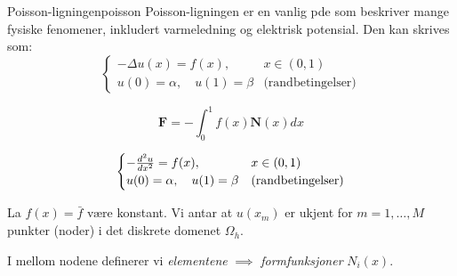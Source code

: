 \begin{example}{Poisson-ligningen}{poisson}
	Poisson-ligningen er en vanlig \gls{pde} som beskriver mange fysiske fenomener, inkludert varmeledning og elektrisk potensial.
	Den kan skrives som:
	\begin{equation}
		\begin{cases}
			-\Delta u(x) = f(x),              & x \in (0,1)              \\
			u(0) = \alpha, \quad u(1) = \beta & \text{(randbetingelser)}
		\end{cases}
	\end{equation}

	\begin{equation}
		\mathbf{F} = - \int_0^1 f(x) \mathbf{N}(x) dx
	\end{equation}

	\begin{equation}
		\begin{cases}
			-\ddn[u]{2}{x} = f(x),            & x \in (0,1)              \\
			u(0) = \alpha, \quad u(1) = \beta & \text{(randbetingelser)}
		\end{cases}
	\end{equation}

\end{example}

La \(f(x) = \bar{f}\) være konstant. Vi antar at \(u(x_m)\) er ukjent for \(m = 1, \ldots, M\) punkter (noder) i det diskrete domenet \(\Omega_h\).

I mellom nodene definerer vi \textit{elementene} \(\implies\) \textit{formfunksjoner} \(N_i(x)\).

